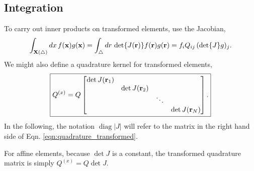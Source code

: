 \subsection{Integration}

To carry out inner products on transformed elements, use the Jacobian,
%
\begin{equation}
\int_{\textbf{X}(\bigtriangleup)} dx \, f(\textbf{x}) g(\textbf{x}) = \int_\bigtriangleup dr \, \det \{ J(\textbf{r}) \} f(\textbf{r}) g(\textbf{r}) = f_i Q_{ij} \, (\det \{J\} g)_j.
\end{equation}
%
We might also define a quadrature kernel for transformed elements,
%
\begin{equation}
\boxed{
Q^{(x)} = Q
\begin{bmatrix}
\det J(\textbf{r}_1) & & & \\
& \det J(\textbf{r}_2) & & \\
& & \ddots & \\
& & & \det J(\textbf{r}_N)
\end{bmatrix}.
}
\label{eqn:quadrature_transformed}
\end{equation}
%
In the following, the notation $\operatorname{diag} |J|$ will refer to the matrix in the right hand side of Eqn. \ref{eqn:quadrature_transformed}.

For affine elements, because $\det J$ is a constant, the transformed quadrature matrix is simply $Q^{(x)} = Q \det J$.

